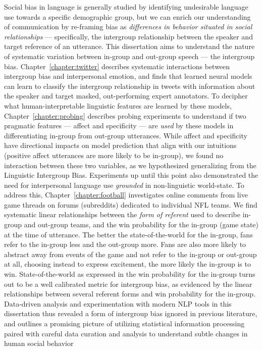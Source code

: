 Social bias in language is generally studied by identifying undesirable language use towards a specific demographic group, but we can enrich our understanding of communication by re-framing bias as \emph{differences in behavior situated in social relationships} --- specifically, the intergroup relationship between the speaker and target reference of an utterance. This dissertation aims to understand the nature of systematic variation between in-group and out-group speech --- the intergroup bias. Chapter~\ref{chapter:twitter} describes systematic interactions between intergroup bias and interpersonal emotion, and finds that learned neural models can learn to classify the intergroup relationship in tweets with information about the speaker and target masked, out-performing expert annotators. To decipher what human-interpretable linguistic features are learned by these models, Chapter~\ref{chapter:probing} describes probing experiments to understand if two pragmatic features --- affect and specificity --- are \emph{used} by these models in differentiating in-group from out-group utterances. While affect and specificity have directional impacts on model prediction that align with our intuitions (positive affect utterances are more likely to be in-group), we found no interaction between these two variables, as we hypothesized generalizing from the Linguistic Intergroup Bias. Experiments up until this point also demonstrated the need for interpersonal language use \emph{grounded} in non-linguistic world-state. To address this, Chapter~\ref{chapter:football} investigates online comments from live game threads on forums (subreddits) dedicated to individual NFL teams. We find systematic linear relationships between the \emph{form of referent} used to describe in-group and out-group teams, and the win probability for the in-group (game state) at the time of utterance. The better the state-of-the-world for the in-group, fans refer to the in-group less and the out-group more. Fans are also more likely to abstract away from events of the game and not refer to the in-group or out-group at all, choosing instead to express excitement, the more likely the in-group is to win. State-of-the-world as expressed in the win probability for the in-group turns out to be a well calibrated metric for intergroup bias, as evidenced by the linear relationships between several referent forms and win probability for the in-group. Data-driven analysis and experimentation with modern NLP tools in this dissertation thus revealed a form of intergroup bias ignored in previous literature, and outlines a promising picture of utilizing statistical information processing paired with careful data curation and analysis to understand subtle changes in human social behavior
